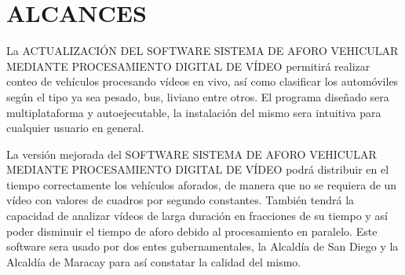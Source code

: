 \section{ALCANCES}
La ACTUALIZACIÓN DEL SOFTWARE SISTEMA DE AFORO VEHICULAR MEDIANTE PROCESAMIENTO DIGITAL DE VÍDEO permitirá realizar conteo de vehículos procesando vídeos en vivo, así como clasificar los automóviles según el tipo ya sea pesado, bus, liviano entre otros. El programa diseñado sera multiplataforma y autoejecutable, la instalación del mismo sera intuitiva para cualquier usuario en general.

La versión mejorada del SOFTWARE SISTEMA DE AFORO VEHICULAR MEDIANTE PROCESAMIENTO DIGITAL DE VÍDEO podrá distribuir en el tiempo correctamente los vehículos aforados, de manera que no se requiera de un vídeo con valores de cuadros por segundo constantes. También tendrá la capacidad de analizar vídeos de larga duración en fracciones de su tiempo y así poder disminuir el tiempo de aforo debido al procesamiento en paralelo. Este software  sera usado por dos   entes gubernamentales, la Alcaldía de San Diego y la Alcaldía de Maracay para así constatar la calidad del mismo.